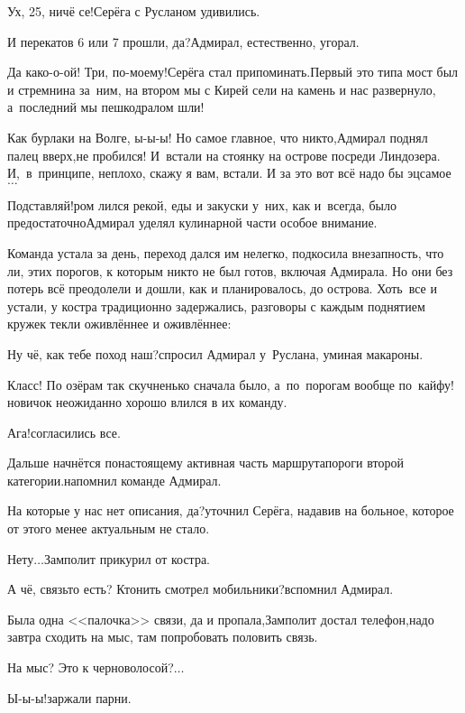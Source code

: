 \diagdash Ух, 25, ничё се!\mdash Серёга с Русланом удивились.

\diagdash И перекатов 6 или 7 прошли, да?\mdash Адмирал, естественно, угорал.

\diagdash Да како-о-ой! Три, по-моему!\mdash Серёга стал припоминать.\mdash Первый это типа мост был и стремнина за~ним, на втором мы с Кирей сели на камень и нас развернуло, а~последний мы пешкодралом шли!

\diagdash Как бурлаки на Волге, ы-ы-ы! Но самое главное, что никто,\mdash Адмирал поднял палец вверх,\mdash не пробился! И~встали на стоянку на острове посреди Линдозера. И,~в~принципе, неплохо, скажу я вам, встали. И за это вот всё надо бы эц\sdash самое$\ldots$

\diagdash Подставляй!\mdash ром лился рекой, еды и закуски у~них, как и~всегда, было предостаточно\mdash Адмирал уделял кулинарной части особое внимание.

Команда устала за день, переход дался им нелегко, подкосила внезапность, что ли, этих порогов, к которым никто не был готов, включая Адмирала. Но они без потерь всё преодолели и дошли, как и планировалось, до острова. Хоть~все и устали, у костра традиционно задержались, разговоры с каждым поднятием кружек текли оживлённее и оживлённее:

\diagdash Ну чё, как тебе поход наш?\mdash спросил Адмирал у~Руслана, уминая макароны.

\diagdash Класс! По озёрам так скучненько сначала было, а~по~порогам вообще по~кайфу!\mdash новичок неожиданно хорошо влился в их команду.

\diagdash Ага!\mdash согласились все.

\diagdash Дальше начнётся по\sdash настоящему активная часть маршрута\mdash пороги второй категории.\mdash напомнил команде Адмирал.

\diagdash На которые у нас нет описания, да?\mdash уточнил Серёга, надавив на больное, которое от этого менее актуальным не стало.

\diagdash Нету$\ldots$\mdash Замполит прикурил от костра.

\diagdash А чё, связь\sdash то есть? Кто\sdash нить смотрел мобильники?\mdash вспомнил Адмирал.

\diagdash Была одна <<палочка>> связи, да и пропала,\mdash Замполит достал телефон,\mdash надо завтра сходить на мыс, там попробовать половить связь.

\diagdash На мыс? Это к черноволосой?$\ldots$

\diagdash Ы-ы-ы!\mdash заржали парни.

